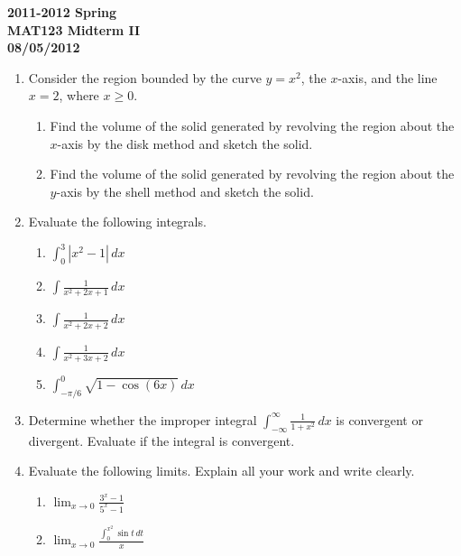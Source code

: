 \documentclass[a4paper, 12pt]{article}
\begin{document}
\newpage
{}
{}

\begin{center}
\textbf{2011-2012 Spring\\MAT123 Midterm II\\08/05/2012}
\end{center}

\begin{enumerate}[leftmargin=*,label=\textbf{\arabic*.}]
\item Consider the region bounded by the curve $y=x^2$, the $x$-axis, and the line $x=2$, where $x\geq0$.

\begin{enumerate}[leftmargin=*,label=\textbf{\alph*.}]
\item Find the volume of the solid generated by revolving the region about the $x$-axis by the disk method and sketch the solid.
\item Find the volume of the solid generated by revolving the region about the $y$-axis by the shell method and sketch the solid.
\end{enumerate}

\item Evaluate the following integrals.

\begin{enumerate}[leftmargin=*,label=\textbf{\alph*.}]
\item $\displaystyle \int_0^3\left|x^2-1\right|\, dx$
\item $\displaystyle\int\frac1{x^2+2x+1}\,dx$
\item $\displaystyle\int\frac1{x^2+2x+2}\,dx$
\item $\displaystyle\int\frac1{x^2+3x+2}\,dx$
\item $\displaystyle\int_{-\pi/6}^0\sqrt{1-\cos(6x)}\,dx$
\end{enumerate}

\item Determine whether the improper integral $\displaystyle\int_{-\infty}^\infty\frac1{1+x^2}\,dx$ is convergent or divergent. Evaluate if the integral is convergent.

\item Evaluate the following limits. Explain all your work and write clearly.

\begin{enumerate}[leftmargin=*,label=\textbf{\alph*.}]
\item $\displaystyle\lim_{x\to0}\frac{3^x-1}{5^x-1}$
\item $\displaystyle \lim_{x\to0}\frac{\displaystyle\int_0^{x^2}\sin t\,dt}x$
\end{enumerate}


\end{enumerate}
\end{document}
